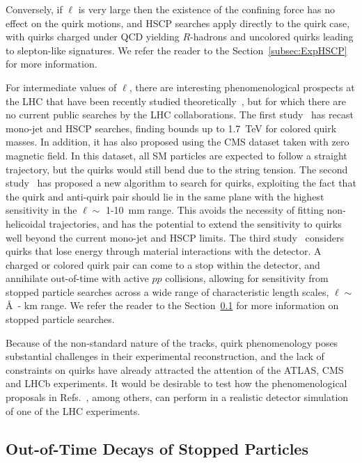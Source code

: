 Conversely, if $\ell$ is very large then the existence of the confining force has no effect on the quirk motions, and HSCP searches apply directly to the quirk case, with quirks charged under QCD yielding $R$-hadrons and uncolored quirks leading to slepton-like signatures. We refer the reader to the Section~\ref{subsec:ExpHSCP} for more information.

For intermediate values of $\ell$, there are interesting phenomenological prospects at the LHC that have been recently studied theoretically~\cite{Farina:2017cts,Knapen:2017kly,Evans:2018jmd}, but for which there are no current public searches by the LHC collaborations. The first study~\cite{Farina:2017cts} has recast mono-jet and HSCP searches, finding bounds up to 1.7~TeV for colored quirk masses. In addition, it has also proposed using the CMS dataset taken with zero magnetic field. In this dataset, all SM particles are expected to follow a straight trajectory, but the quirks would still bend due to the string tension. The second study~\cite{Knapen:2017kly} has proposed a new algorithm to search for quirks, exploiting the fact that the quirk and anti-quirk pair should lie in the same plane with the highest sensitivity in the $\ell \sim$ 1-10~mm range. This avoids the necessity of fitting non-helicoidal trajectories, and has the potential to extend the sensitivity to quirks well beyond the current mono-jet and HSCP limits. The third study~\cite{Evans:2018jmd} considers quirks that lose energy through material interactions with the detector.  A charged or colored quirk pair can come to a stop within the detector, and annihilate out-of-time with active $pp$ collisions, allowing for sensitivity from stopped particle searches across a wide range of characteristic length scales, $\ell \sim$ \AA\ - km range.  We refer the reader to the Section~\ref{sec:outoftime} for more information on stopped particle searches.

Because of the non-standard nature of the tracks, quirk phenomenology poses substantial challenges in their experimental reconstruction, and the lack of constraints on quirks have already attracted the attention of the ATLAS, CMS and LHCb experiments. It would be desirable to test how the phenomenological proposals in Refs.~\cite{Farina:2017cts,Knapen:2017kly,Evans:2018jmd}, among others, can perform in a realistic detector simulation of one of the LHC experiments.



\subsection{Out-of-Time Decays of Stopped Particles}
\label{sec:outoftime}


